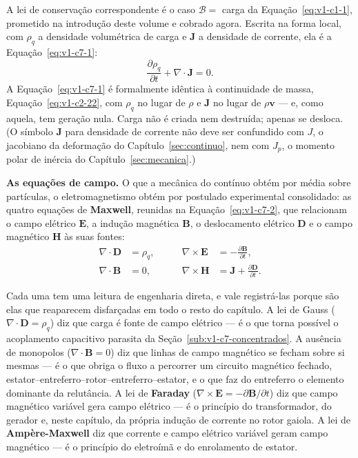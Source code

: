 \documentclass[12pt,a4paper]{article}
\numberwithin{equation}{section}
\numberwithin{table}{section}
\numberwithin{figure}{section}
\begin{document}
A lei de conservação correspondente é o caso $\mathcal{B} =$ carga da
Equação~\eqref{eq:v1-c1-1}, prometido na introdução deste volume e cobrado
agora. Escrita na forma local, com $\rho_q$ a densidade volumétrica de carga e
$\mathbf{J}$ a densidade de corrente, ela é a Equação~\eqref{eq:v1-c7-1}:
\begin{equation}\label{eq:v1-c7-1}
\frac{\partial \rho_q}{\partial t} + \nabla\cdot\mathbf{J} = 0 .
\end{equation}
A Equação~\eqref{eq:v1-c7-1} é formalmente idêntica à continuidade de massa,
Equação~\eqref{eq:v1-c2-22}, com $\rho_q$ no lugar de $\rho$ e $\mathbf{J}$ no
lugar de $\rho\mathbf{v}$ --- e, como aquela, tem geração nula. Carga não é
criada nem destruída; apenas se desloca. (O símbolo $\mathbf{J}$ para densidade
de corrente não deve ser confundido com $J$, o jacobiano da deformação do
Capítulo~\ref{sec:continuo}, nem com $J_p$, o momento polar de inércia do
Capítulo~\ref{sec:mecanica}.)

\textbf{As equações de campo.} O que a mecânica do contínuo obtém por média
sobre partículas, o eletromagnetismo obtém por postulado experimental
consolidado: as quatro equações de \textbf{Maxwell}, reunidas na
Equação~\eqref{eq:v1-c7-2}, que relacionam o campo elétrico $\mathbf{E}$, a
indução magnética $\mathbf{B}$, o deslocamento elétrico $\mathbf{D}$ e o campo
magnético $\mathbf{H}$ às suas fontes:
\begin{equation}\label{eq:v1-c7-2}
\begin{aligned}
\nabla\cdot\mathbf{D} &= \rho_q, &\qquad
\nabla\times\mathbf{E} &= -\frac{\partial\mathbf{B}}{\partial t}, \\[4pt]
\nabla\cdot\mathbf{B} &= 0, &\qquad
\nabla\times\mathbf{H} &= \mathbf{J} + \frac{\partial\mathbf{D}}{\partial t} .
\end{aligned}
\end{equation}

Cada uma tem uma leitura de engenharia direta, e vale registrá-las porque são
elas que reaparecem disfarçadas em todo o resto do capítulo. A lei de Gauss
($\nabla\cdot\mathbf{D} = \rho_q$) diz que carga é fonte de campo elétrico ---
é o que torna possível o acoplamento capacitivo parasita da
Seção~\ref{sub:v1-c7-concentrados}. A ausência de monopolos
($\nabla\cdot\mathbf{B} = 0$) diz que linhas de campo magnético se fecham sobre
si mesmas --- é o que obriga o fluxo a percorrer um circuito magnético fechado,
estator--entreferro--rotor--entreferro--estator, e o que faz do entreferro o
elemento dominante da relutância. A lei de \textbf{Faraday}
($\nabla\times\mathbf{E} = -\partial\mathbf{B}/\partial t$) diz que campo
magnético variável gera campo elétrico --- é o princípio do transformador, do
gerador e, neste capítulo, da própria indução de corrente no rotor gaiola. A lei
de \textbf{Ampère-Maxwell} diz que corrente e campo elétrico variável geram
campo magnético --- é o princípio do eletroímã e do enrolamento de estator.
\end{document}
